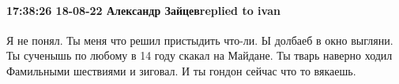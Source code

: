  
 
 
 
 

\paragraph{17:38:26 18-08-22 Александр Зайцевreplied to ivan}

Я не понял. Ты меня что решил пристыдить что-ли. Ы долбаеб в окно выгляни. Ты
сученышь по любому в 14 году скакал на Майдане. Ты тварь наверно ходил
Фамильными шествиями и зиговал. И ты гондон сейчас что то вякаешь.
